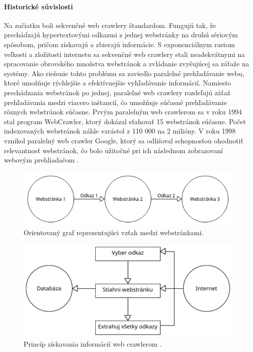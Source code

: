 \documentclass[10pt,twoside,slovak,a4paper]{article}
\begin{document}
\paragraph{Historické súvislosti}

Na začiatku boli sekvenčné web crawlery štandardom. Fungujú tak, že prechádzajú hypertextovými odkazmi z jednej webstránky na druhú sériovým spôsobom, pričom získavajú a zbierajú informácie. S exponenciálnym rastom veľkosti a zložitosti internetu sa sekvenčné web crawlery stali neadekvátnymi na spracovanie obrovského množstva webstránok a zvládanie zvyšujúcej sa záťaže na systémy. Ako riešenie tohto problému sa zaviedlo paralelné prehľadávanie webu, ktoré umožňuje rýchlejšie a efektívnejšie vyhľadávanie informácií. Namiesto prechádzania webstránok po jednej, paralelné web crawlery rozdeľujú záťaž prehľadávania medzi viacero inštancií, čo umožňuje súčasné prehľadávanie rôznych webstránok súčasne. Prvým paralelným web crawlerom sa v roku 1994 stal program WebCrawler, ktorý dokázal sťahovať 15 webstránok súčasne. Počet indexovaných webstránok náhle vzrástol z 110 000 na 2 milióny. V roku 1998 vznikol paralelný web crawler Google, ktorý sa odlišoval schopnosťou ohodnotiť relevantnosť webstránok, čo bolo užitočné pri ich následnom zobrazovaní webovým prehliadačom \cite{mirtaheri2014brief}.

\begin{figure}[hbt!]
    \centering
    \includegraphics[width=\linewidth]{diagram1.png}
    \caption{Orientovaný graf reprezentujúci vzťah medzi webstránkami.}
\end{figure}

\begin{figure}[hbt!]
    \centering
    \includegraphics[width=\linewidth]{diagram2.png}
    \caption{Princíp získavania informácií web crawlerom \cite{kausar2013web}.}
\end{figure}
\end{document}

